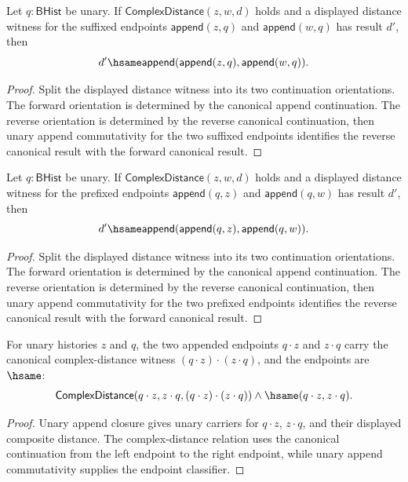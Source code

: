 \begin{theorem}
\label{thm:complex-distance-append-constant-result-deterministic}
Let \(q:\mathsf{BHist}\) be unary. If \(\mathsf{ComplexDistance}(z,w,d)\)
holds and a displayed distance witness for the suffixed endpoints
\(\mathsf{append}(z,q)\) and \(\mathsf{append}(w,q)\) has result \(d'\), then
$$
d' \hsame
\mathsf{append}(\mathsf{append}(z,q),\mathsf{append}(w,q)).
$$
\end{theorem}
\begin{proof}
Split the displayed distance witness into its two continuation orientations.
The forward orientation is determined by the canonical append continuation.
The reverse orientation is determined by the reverse canonical continuation,
then unary append commutativity for the two suffixed endpoints identifies the
reverse canonical result with the forward canonical result.
\end{proof}

\begin{theorem}
\label{thm:complex-distance-prepend-constant-result-deterministic}
Let \(q:\mathsf{BHist}\) be unary. If \(\mathsf{ComplexDistance}(z,w,d)\)
holds and a displayed distance witness for the prefixed endpoints
\(\mathsf{append}(q,z)\) and \(\mathsf{append}(q,w)\) has result \(d'\), then
$$
d' \hsame
\mathsf{append}(\mathsf{append}(q,z),\mathsf{append}(q,w)).
$$
\end{theorem}
\begin{proof}
Split the displayed distance witness into its two continuation orientations.
The forward orientation is determined by the canonical append continuation.
The reverse orientation is determined by the reverse canonical continuation,
then unary append commutativity for the two prefixed endpoints identifies the
reverse canonical result with the forward canonical result.
\end{proof}

\begin{theorem}
\label{thm:complex-distance-unary-append-comm-package}
For unary histories $z$ and $q$, the two appended endpoints $q\cdot z$ and
$z\cdot q$ carry the canonical complex-distance witness
$(q\cdot z)\cdot(z\cdot q)$, and the endpoints are $\hsame$:
$$
\mathsf{ComplexDistance}(q\cdot z,z\cdot q,(q\cdot z)\cdot(z\cdot q))
\land \hsame(q\cdot z,z\cdot q).
$$
\end{theorem}
\begin{proof}
Unary append closure gives unary carriers for $q\cdot z$, $z\cdot q$, and
their displayed composite distance. The complex-distance relation uses the
canonical continuation from the left endpoint to the right endpoint, while
unary append commutativity supplies the endpoint classifier.
\end{proof}

